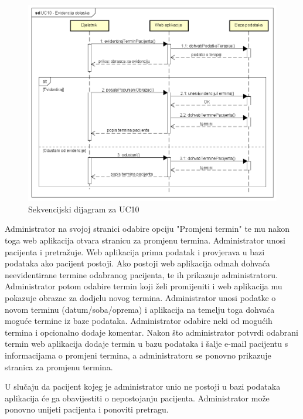 				\begin{figure}[H]
					\includegraphics[scale=0.4]{slike/UC10_Evidencija_dolaska.PNG} %
					\centering
					\caption{Sekvencijski dijagram za UC10}
					\label{fig:sekvencijski_dijagram_2}
				\end{figure}
				
				
				\textbf{}
				
				Administrator na svojoj stranici odabire opciju "Promjeni termin" te mu nakon toga web aplikacija otvara stranicu za promjenu termina. Administrator unosi pacijenta i pretražuje. Web aplikacija prima podatak i provjerava u bazi podataka ako pacijent postoji. Ako postoji web aplikacija odmah dohvaća neevidentirane termine odabranog pacijenta, te ih prikazuje administratoru. Administrator potom odabire termin koji želi promijeniti i web aplikacija mu pokazuje obrazac za dodjelu novog termina. Administrator unosi podatke o novom terminu (datum/soba/oprema) i aplikacija na temelju toga dohvaća moguće termine iz baze podataka. Administrator odabire neki od mogućih termina i opcionalno dodaje komentar. Nakon što administrator potvrdi odabrani termin web aplikacija dodaje termin u bazu podataka i šalje e-mail pacijentu s informacijama o promjeni termina, a administratoru se ponovno prikazuje stranica za promjenu termina. 
				
				U slučaju da pacijent kojeg je administrator unio ne postoji u bazi podataka aplikacija će ga obavijestiti o nepostojanju pacijenta. Administrator može ponovno unijeti pacijenta i ponoviti pretragu. 
				

